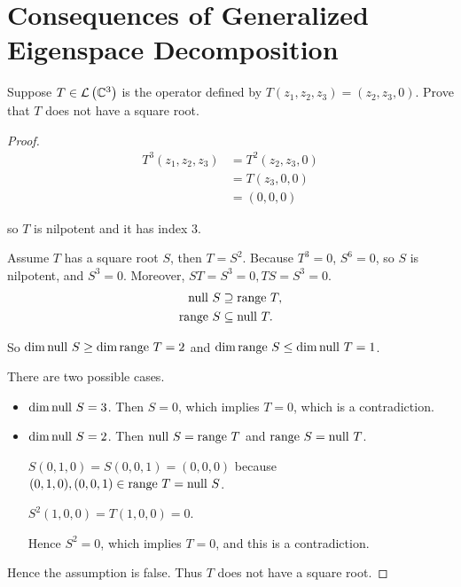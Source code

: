 \section{Consequences of Generalized Eigenspace Decomposition}

\begin{exercise}\label{chapter8:sectionC:exercise1}
    Suppose $T\in\mathcal{L}\left({\mathbb{C}^{3}}\right)$ is the operator defined by $T(z_{1}, z_{2}, z_{3}) = (z_{2}, z_{3}, 0)$. Prove that $T$ does not have a square root.
\end{exercise}

\begin{proof}
    \begin{align*}
        T^{3}(z_{1}, z_{2}, z_{3}) & = T^{2}(z_{2}, z_{3}, 0) \\
                                   & = T(z_{3}, 0, 0)         \\
                                   & = (0, 0, 0)
    \end{align*}

    so $T$ is nilpotent and it has index $3$.

    Assume $T$ has a square root $S$, then $T = S^{2}$. Because $T^{3} = 0$, $S^{6} = 0$, so $S$ is nilpotent, and $S^{3} = 0$. Moreover, $ST = S^{3} = 0, TS = S^{3} = 0$.
    \begin{align*}
        \operatorname{null}\,{S} & \supseteq \operatorname{range}\,{T},  \\
        \operatorname{range}\,{S}  & \subseteq \operatorname{null}\,{T}.
    \end{align*}

    So $\dim\operatorname{null}\,{S} \geq \dim\operatorname{range}\,{T} = 2$ and $\dim\operatorname{range}\,{S} \leq \dim\operatorname{null}\,{T} = 1$.

    There are two possible cases.
    \begin{itemize}
        \item $\dim\operatorname{null}\,{S} = 3$. Then $S = 0$, which implies $T = 0$, which is a contradiction.
        \item $\dim\operatorname{null}\,{S} = 2$. Then $\operatorname{null}\,{S} = \operatorname{range}\,{T}$ and $\operatorname{range}\,{S} = \operatorname{null}\,{T}$.

              $S(0, 1, 0) = S(0, 0, 1) = (0, 0, 0)$ because $(0, 1, 0), (0, 0, 1)\in \operatorname{range}\,{T} = \operatorname{null}\,{S}$.

              $S^{2}(1, 0, 0) = T(1, 0, 0) = 0$.

              Hence $S^{2} = 0$, which implies $T = 0$, and this is a contradiction.
    \end{itemize}

    Hence the assumption is false. Thus $T$ does not have a square root.
\end{proof}
\newpage

